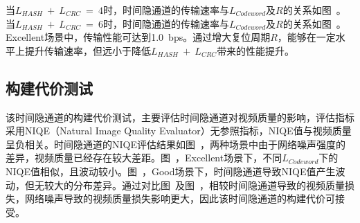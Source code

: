 当$L_{HASH}\ +\ L_{CRC}\ =\ 4$时，时间隐通道的传输速率与$L_{Codeword}$及$R$的关系如图\ 。当$L_{HASH}\ +\ L_{CRC}\ =\ 6$时，时间隐通道的传输速率与$L_{Codeword}$及$R$的关系如图\ 。Excellent场景中，传输性能可达到{1.0\ bps}。通过增大复位周期$R$，能够在一定水平上提升传输速率，但远小于降低$L_{HASH}\ +\ L_{CRC}$带来的性能提升。

\subsection{构建代价测试}
\label{chap:hash:result:cost}


该时间隐通道的构建代价测试，主要评估时间隐通道对视频质量的影响，评估指标采用NIQE（Natural Image Quality Evaluator）无参照指标，NIQE值与视频质量呈负相关。时间隐通道的NIQE评估结果如图\ ，两种场景中由于网络噪声强度的差异，视频质量已经存在较大差距。图\ ，Excellent场景下，不同$L_{Codeword}$下的NIQE值相似，且波动较小。图\ ，Good场景下，时间隐通道导致NIQE值产生波动，但无较大的分布差异。通过对比图\ 及图\ ，相较时间隐通道导致的视频质量损失，网络噪声导致的视频质量损失影响更大，因此该时间隐通道的构建代价可接受。


